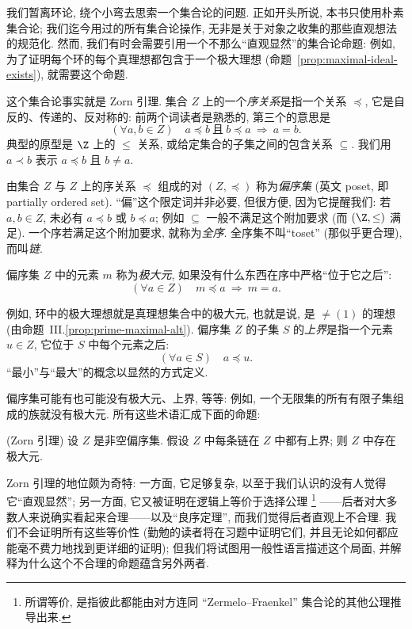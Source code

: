 我们暂离环论, 绕个小弯去思索一个集合论的问题. 正如开头所说, 本书只使用朴素集合论; 我们迄今用过的所有集合论操作, 无非是关于对象之收集的那些直观想法的规范化. 然而, 我们有时会需要引用一个不那么``直观显然''的集合论命题: 例如, 为了证明每个环的每个真理想都包含于一个极大理想 (命题~\ref{prop:maximal-ideal-exists}), 就需要这个命题.

\noindent 这个集合论事实就是 Zorn 引理. 集合 $Z$ 上的一个\emph{序关系}是指一个关系 $\preceq$, 它是自反的、传递的、反对称的: 前两个词读者是熟悉的, 第三个的意思是
\[
(\forall a,b\in Z)\quad a\preceq b\ \text{且}\ b\preceq a \ \Longrightarrow\ a=b.
\]
典型的原型是 $\Z$ 上的 $\le$ 关系, 或给定集合的子集之间的包含关系 $\subseteq$. 我们用 $a\prec b$ 表示 $a\preceq b$ 且 $b\neq a$.

\noindent 由集合 $Z$ 与 $Z$ 上的序关系 $\preceq$ 组成的对 $(Z,\preceq)$ 称为\emph{偏序集} (英文 poset, 即 partially ordered set). ``偏''这个限定词并非必要, 但很方便, 因为它提醒我们: 若 $a,b\in Z$, 未必有 $a\preceq b$ 或 $b\preceq a$; 例如 $\subseteq$ 一般不满足这个附加要求 (而 $(\Z,\le)$ 满足). 一个序若满足这个附加要求, 就称为\emph{全序}. 全序集不叫``toset'' (那似乎更合理), 而叫\emph{链}.

\noindent 偏序集 $Z$ 中的元素 $m$ 称为\emph{极大元}, 如果没有什么东西在序中严格``位于它之后'':
\[
(\forall a\in Z)\quad m\preceq a \ \Longrightarrow\ m=a.
\]

\noindent 例如, 环中的极大理想就是真理想集合中的极大元, 也就是说, 是 $\neq (1)$ 的理想 (由命题~III.\ref{prop:prime-maximal-alt}). 偏序集 $Z$ 的子集 $S$ 的\emph{上界}是指一个元素 $u\in Z$, 它位于 $S$ 中每个元素之后:
\[
(\forall a\in S)\quad a\preceq u.
\]
``最小''与``最大''的概念以显然的方式定义.

\noindent 偏序集可能有也可能没有极大元、上界, 等等: 例如, 一个无限集的所有有限子集组成的族就没有极大元. 所有这些术语汇成下面的命题:

\begin{lemma}\label{lem:zorn}
(Zorn 引理) 设 $Z$ 是非空偏序集. 假设 $Z$ 中每条链在 $Z$ 中都有上界; 则 $Z$ 中存在极大元.
\end{lemma}

\noindent Zorn 引理的地位颇为奇特: 一方面, 它足够复杂, 以至于我们认识的没有人觉得它``直观显然''; 另一方面, 它又被证明在逻辑上等价于选择公理%
\footnote{所谓等价, 是指彼此都能由对方连同 ``Zermelo--Fraenkel'' 集合论的其他公理推导出来.}%
——后者对大多数人来说确实看起来合理——以及``良序定理'', 而我们觉得后者直观上不合理. 我们不会证明所有这些等价性 (勤勉的读者将在习题中证明它们, 并且无论如何都应能毫不费力地找到更详细的证明); 但我们将试图用一般性语言描述这个局面, 并解释为什么这个不合理的命题蕴含另外两者.

